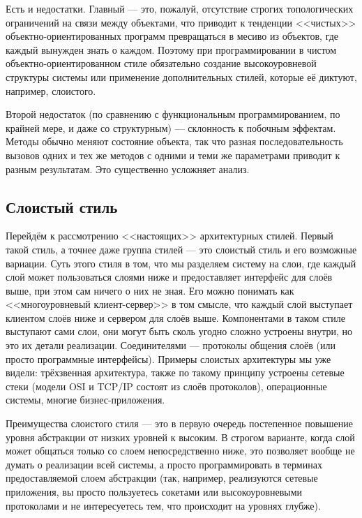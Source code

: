 \documentclass{../../text-style}
\begin{document}
Есть и недостатки. Главный --- это, пожалуй, отсутствие строгих топологических ограничений на связи между объектами, что приводит к тенденции <<чистых>> объектно-ориентированных программ превращаться в месиво из объектов, где каждый вынужден знать о каждом. Поэтому при программировании в чистом объектно-ориентированном стиле обязательно создание высокоуровневой структуры системы или применение дополнительных стилей, которые её диктуют, например, слоистого.

Второй недостаток (по сравнению с функциональным программированием, по крайней мере, и даже со структурным) --- склонность к побочным эффектам. Методы обычно меняют состояние объекта, так что разная последовательность вызовов одних и тех же методов с одними и теми же параметрами приводит к разным результатам. Это существенно усложняет анализ.

\subsection{Слоистый стиль}

Перейдём к рассмотрению <<настоящих>> архитектурных стилей. Первый такой стиль, а точнее даже группа стилей --- это слоистый стиль и его возможные вариации. Суть этого стиля в том, что мы разделяем систему на слои, где каждый слой может пользоваться слоями ниже и предоставляет интерфейс для слоёв выше, при этом сам ничего о них не зная. Его можно понимать как <<многоуровневый клиент-сервер>> в том смысле, что каждый слой выступает клиентом слоёв ниже и сервером для слоёв выше. Компонентами в таком стиле выступают сами слои, они могут быть сколь угодно сложно устроены внутри, но это их детали реализации. Соединителями --- протоколы общения слоёв (или просто программные интерфейсы). Примеры слоистых архитектуры мы уже видели: трёхзвенная архитектура, также по такому принципу устроены сетевые стеки (модели OSI и TCP/IP состоят из слоёв протоколов), операционные системы, многие бизнес-приложения.

Преимущества слоистого стиля --- это в первую очередь постепенное повышение уровня абстракции от низких уровней к высоким. В строгом варианте, когда слой может общаться только со слоем непосредственно ниже, это позволяет вообще не думать о  реализации всей системы, а просто программировать в терминах предоставляемой слоем абстракции (так, например, реализуются сетевые приложения, вы просто пользуетесь сокетами или высокоуровневыми протоколами и не интересуетесь тем, что происходит на уровнях глубже).
\end{document}

